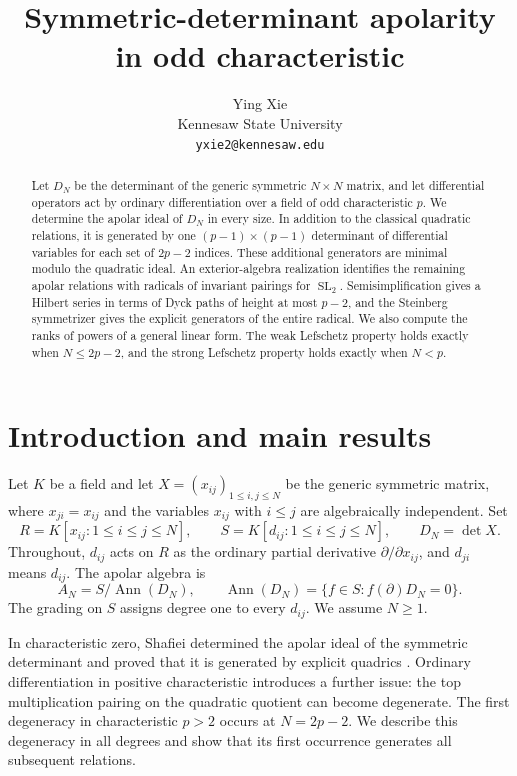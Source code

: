 \documentclass[11pt]{article}
\title{Symmetric-determinant apolarity\protect\\ in odd characteristic}
\author{Ying Xie\\[3pt]
  \small Kennesaw State University\\
  \small\texttt{yxie2@kennesaw.edu}}
\date{}
\theoremstyle{definition}
\theoremstyle{remark}
\numberwithin{equation}{section}
\DeclareMathOperator{\Ann}{Ann}
\DeclareMathOperator{\SL}{SL}
\newcommand{\kk}{K}
\newcommand{\set}[1]{\{#1\}}
\begin{document}
\maketitle

\begin{abstract}
Let $D_N$ be the determinant of the generic symmetric $N\times N$ matrix,
and let differential operators act by ordinary differentiation over a field
of odd characteristic $p$. We determine the apolar ideal of $D_N$ in every
size. In addition to the classical quadratic relations, it is generated by
one $(p-1)\times(p-1)$ determinant of differential variables for each set of
$2p-2$ indices. These additional generators are minimal modulo the
quadratic ideal. An exterior-algebra realization identifies the remaining
apolar relations with radicals of invariant pairings for $\SL_2$.
Semisimplification gives a Hilbert series in terms of Dyck paths of height
at most $p-2$, and the Steinberg symmetrizer gives the explicit generators
of the entire radical. We also compute the ranks of powers of a general
linear form. The weak Lefschetz property holds exactly when $N\leq 2p-2$,
and the strong Lefschetz property holds exactly when $N<p$.
\end{abstract}

\section{Introduction and main results}

Let $\kk$ be a field and let $X=(x_{ij})_{1\leq i,j\leq N}$ be the
generic symmetric matrix, where $x_{ji}=x_{ij}$ and the variables
$x_{ij}$ with $i\leq j$ are algebraically independent. Set
\[
 R=\kk[x_{ij}:1\leq i\leq j\leq N],\qquad
 S=\kk[d_{ij}:1\leq i\leq j\leq N],\qquad D_N=\det X.
\]
Throughout, $d_{ij}$ acts on $R$ as the ordinary partial derivative
$\partial/\partial x_{ij}$, and $d_{ji}$ means $d_{ij}$. The apolar algebra is
\[
 A_N=S/\Ann(D_N),\qquad
 \Ann(D_N)=\set{f\in S:f(\partial)D_N=0}.
\]
The grading on $S$ assigns degree one to every $d_{ij}$. We assume $N\geq1$.

In characteristic zero, Shafiei determined the apolar ideal of the
symmetric determinant and proved that it is generated by explicit
quadrics \cite[Theorem~3.10]{Shafiei}. Ordinary differentiation in positive
characteristic introduces a further issue: the top multiplication pairing
on the quadratic quotient can become degenerate. The first degeneracy in
characteristic $p>2$ occurs at $N=2p-2$. We describe this degeneracy in all
degrees and show that its first occurrence generates all subsequent
relations.
\end{document}
